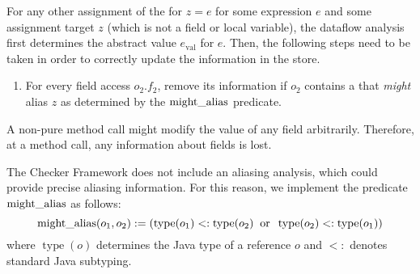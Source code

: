
For any other assignment of the for $z = e$ for some expression $e$ and some
assignment target $z$ (which is not a field or local variable),
the dataflow analysis first determines the abstract value $e_\text{val}$ for
$e$. Then, the following steps need to be taken in order to correctly update
the information in the store.
\begin{enumerate}
    \item For every field access $o_2.f_2$, remove its information if
    $o_2$ contains a  that \emph{might}
    alias $z$ as determined by the $\operatorname{might\_alias}$ predicate.
\end{enumerate}



A non-pure method call might modify the value of any field arbitrarily.
Therefore, at a method call, any information about fields is lost.



The Checker Framework does not include an aliasing analysis, which could
provide precise aliasing information.  For this reason, we implement the
predicate $\operatorname{might\_alias}$ as follows:
\[ \operatorname{might\_alias}(o_1,o_2) :=
\left(\operatorname{type}(o_1) <: \operatorname{type}(o_2)
\;\;\text{or}\;\;
\operatorname{type}(o_2) <: \operatorname{type}(o_1) \right) \]
where $\operatorname{type}(o)$ determines the Java type of a reference $o$
and $<:$ denotes standard Java subtyping.


